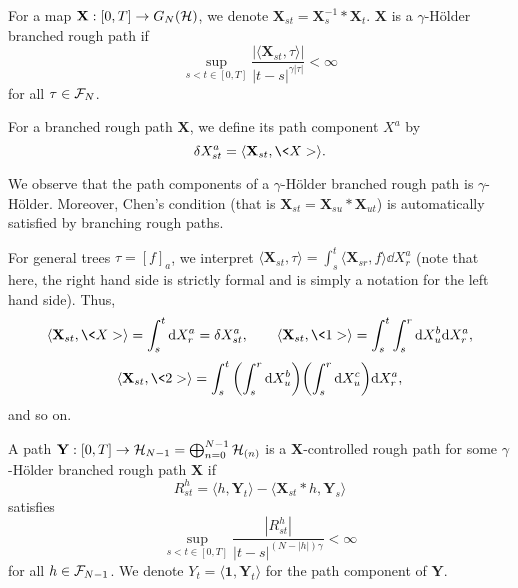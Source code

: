 \documentclass[11pt]{style/preprint}
\begin{document}
\begin{definition}
  For a map \(\mathbf{X} : [0, T] \to G_N({\mathcal H})\), we denote \(\mathbf{X}_{st} = \mathbf{X}^{-1}_s * \mathbf{X}_t\).
  \(\mathbf{X}\) is a \(\gamma\)-H\"older branched rough path if 
  \[\sup_{s < t \in [0, T]} \frac{|\langle \mathbf{X}_{st}, \tau\rangle|} {|t - s|^{\gamma|\tau|}} < \infty\]
  for all \(\tau \in {\mathcal F}_N\).

  For a branched rough path \(\mathbf{X}\), we define its path component \(X^a\) by 
  \[\delta X^a_{st} = \langle \mathbf{X}_{st}, \<X>\rangle.\]
\end{definition}

We observe that the path components of a \(\gamma\)-H\"older branched rough path is \(\gamma\)-H\"older. 
Moreover, Chen's condition (that is \(\mathbf{X}_{st} = \mathbf{X}_{su} * \mathbf{X}_{ut}\)) is automatically 
satisfied by branching rough paths. 

For general trees \(\tau = [f]_a\), we interpret \(\langle \mathbf{X}_{st}, \tau\rangle = 
  \int_s^t \langle \mathbf{X}_{sr}, f\rangle \dd X^a_r\) (note that here, the right hand side is strictly 
formal and is simply a notation for the left hand side). Thus, 
\[\langle \mathbf{X}_{st}, \<X> \rangle = \int_s^t \dd X^a_r = \delta X^a_{st}, \qquad
  \langle \mathbf{X}_{st}, \<1> \rangle = \int_s^t \int_s^r \dd X^b_u \dd X^a_r,\]
\[\langle \mathbf{X}_{st}, \<2>\rangle = \int_s^t \left(\int_s^r \dd X^b_u\right) \left(\int_s^r \dd X^c_u\right) \dd X^a_r,\] 
and so on.

\begin{definition}
  A path \(\mathbf{Y} : [0, T] \to {\mathcal H}_{N - 1} = \bigoplus_{n = 0}^{N - 1} {\mathcal H}_{(n)}\) is a 
  \(\mathbf{X}\)-controlled rough path for some \(\gamma\)-H\"older branched rough path \(\mathbf{X}\) if 
  \[R^h_{st} = \langle h, \mathbf{Y}_t\rangle - \langle \mathbf{X}_{st} * h, \mathbf{Y}_s\rangle\]
  satisfies 
  \[\sup_{s < t \in [0, T]} \frac{|R^h_{st}|}{|t - s|^{(N - |h|)\gamma}} < \infty\] 
  for all \(h \in {\mathcal F}_{N - 1}\). We denote \(Y_t = \langle \mathbf{1}, \mathbf{Y}_t\rangle\) for the 
  path component of \(\mathbf{Y}\).
\end{definition}
\end{document}
